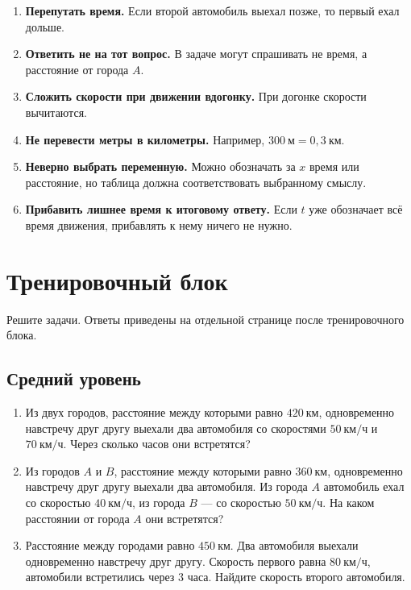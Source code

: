 \documentclass[a4paper,12pt]{article}
\newcommand{\important}[1]{\textcolor{darkaccent}{\textbf{#1}}}
\newcommand{\kmh}{\text{км/ч}}
\newcommand{\km}{\text{км}}
\newcommand{\m}{\text{м}}
\begin{document}
\begin{enumerate}
    \item \important{Перепутать время.} Если второй автомобиль выехал позже, то первый ехал дольше.
    \item \important{Ответить не на тот вопрос.} В задаче могут спрашивать не время, а расстояние от города $A$.
    \item \important{Сложить скорости при движении вдогонку.} При догонке скорости вычитаются.
    \item \important{Не перевести метры в километры.} Например, $300\ \m=0{,}3\ \km$.
    \item \important{Неверно выбрать переменную.} Можно обозначать за $x$ время или расстояние, но таблица должна соответствовать выбранному смыслу.
    \item \important{Прибавить лишнее время к итоговому ответу.} Если $t$ уже обозначает всё время движения, прибавлять к нему ничего не нужно.
\end{enumerate}

\newpage

\section{Тренировочный блок}

Решите задачи. Ответы приведены на отдельной странице после тренировочного блока.

\subsection*{Средний уровень}

\begin{enumerate}
    \item Из двух городов, расстояние между которыми равно $420\ \km$, одновременно навстречу друг другу выехали два автомобиля со скоростями $50\ \kmh$ и $70\ \kmh$. Через сколько часов они встретятся?

    \item Из городов $A$ и $B$, расстояние между которыми равно $360\ \km$, одновременно навстречу друг другу выехали два автомобиля. Из города $A$ автомобиль ехал со скоростью $40\ \kmh$, из города $B$ --- со скоростью $50\ \kmh$. На каком расстоянии от города $A$ они встретятся?

    \item Расстояние между городами равно $450\ \km$. Два автомобиля выехали одновременно навстречу друг другу. Скорость первого равна $80\ \kmh$, автомобили встретились через $3$ часа. Найдите скорость второго автомобиля.
\end{enumerate}
\end{document}
